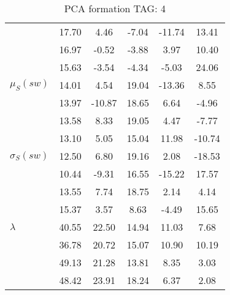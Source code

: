 \begin{table}[h!]
\begin{center}
\begin{tabular}{| l || c | c | c | c | c |}
 & 17.70  & 4.46  & -7.04  & -11.74  & 13.41 \\
 & 16.97  & -0.52  & -3.88  & 3.97  & 10.40 \\
 & 15.63  & -3.54  & -4.34  & -5.03  & 24.06 \\\hline
$\mu_S(sw)$ & 14.01  & 4.54  & 19.04  & -13.36  & 8.55 \\
 & 13.97  & -10.87  & 18.65  & 6.64  & -4.96 \\
 & 13.58  & 8.33  & 19.05  & 4.47  & -7.77 \\
 & 13.10  & 5.05  & 15.04  & 11.98  & -10.74 \\\hline
$\sigma_S(sw)$ & 12.50  & 6.80  & 19.16  & 2.08  & -18.53 \\
 & 10.44  & -9.31  & 16.55  & -15.22  & 17.57 \\
 & 13.55  & 7.74  & 18.75  & 2.14  & 4.14 \\
 & 15.37  & 3.57  & 8.63  & -4.49  & 15.65 \\\hline\hline
$\lambda$ & 40.55  & 22.50  & 14.94  & 11.03  & 7.68 \\
 & 36.78  & 20.72  & 15.07  & 10.90  & 10.19 \\
 & 49.13  & 21.28  & 13.81  & 8.35  & 3.03 \\
 & 48.42  & 23.91  & 18.24  & 6.37  & 2.08 \\\hline
\end{tabular}
\caption{PCA formation TAG: 4}
\end{center}
\end{table}
